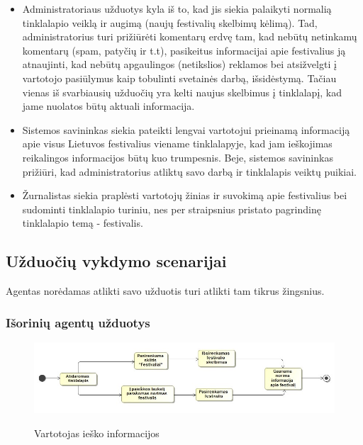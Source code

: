 \documentclass{VUMIFPSkursinis}
\begin{document}
\begin{itemize}
\item Administratoriaus užduotys kyla iš to, kad jis siekia palaikyti normalią tinklalapio veiklą ir augimą (naujų festivalių skelbimų kėlimą). Tad, administratorius turi prižiūrėti komentarų erdvę tam, kad nebūtų netinkamų komentarų (spam, patyčių ir t.t), pasikeitus informacijai apie festivalius ją atnaujinti, kad nebūtų apgaulingos (netikslios) reklamos bei atsižvelgti į vartotojo pasiūlymus kaip tobulinti svetainės darbą, išsidėstymą. Tačiau vienas iš svarbiausių užduočių yra kelti naujus skelbimus į tinklalapį, kad jame nuolatos būtų aktuali informacija.
\item Sistemos savininkas siekia pateikti lengvai vartotojui prieinamą informaciją apie visus Lietuvos festivalius viename tinklalapyje, kad jam ieškojimas reikalingos informacijos būtų kuo trumpesnis. Beje, sistemos savininkas prižiūri, kad administratorius atliktų savo darbą ir tinklalapis veiktų puikiai.
\item Žurnalistas siekia praplėsti vartotojų žinias ir suvokimą apie festivalius bei sudominti tinklalapio turiniu, nes per straipsnius pristato pagrindinę tinklalapio temą - festivalis.
\end{itemize}

\subsection {Užduočių vykdymo scenarijai}

Agentas norėdamas atlikti savo užduotis turi atlikti tam tikrus žingsnius.

\subsubsection{Išorinių agentų užduotys} 
\begin{figure}[H]
    \centering
    \includegraphics[scale=0.55]{img/geri/klientasInfo}
    \label{img:uml3_5}
	\caption{Vartotojas ieško informacijos}
\end{figure}
\end{document}

